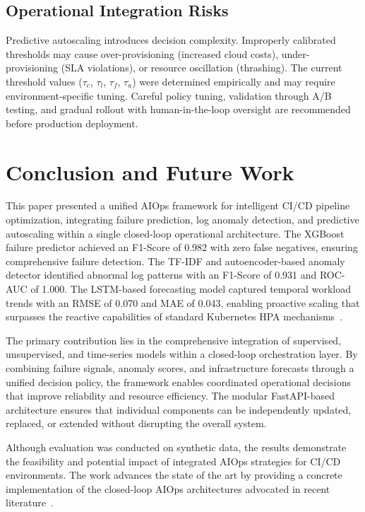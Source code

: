 \documentclass[sn-nature]{sn-jnl}
\theoremstyle{thmstyleone}
\theoremstyle{thmstyletwo}
\theoremstyle{thmstylethree}
\begin{document}
\subsection{Operational Integration Risks}\label{subsec:oprisk}

Predictive autoscaling introduces decision complexity. Improperly calibrated thresholds may cause over-provisioning (increased cloud costs), under-provisioning (SLA violations), or resource oscillation (thrashing). The current threshold values ($\tau_c$, $\tau_l$, $\tau_f$, $\tau_a$) were determined empirically and may require environment-specific tuning. Careful policy tuning, validation through A/B testing, and gradual rollout with human-in-the-loop oversight are recommended before production deployment.

\section{Conclusion and Future Work}\label{sec:conclusion}

This paper presented a unified AIOps framework for intelligent CI/CD pipeline optimization, integrating failure prediction, log anomaly detection, and predictive autoscaling within a single closed-loop operational architecture. The XGBoost failure predictor achieved an F1-Score of 0.982 with zero false negatives, ensuring comprehensive failure detection. The TF-IDF and autoencoder-based anomaly detector identified abnormal log patterns with an F1-Score of 0.931 and ROC-AUC of 1.000. The LSTM-based forecasting model captured temporal workload trends with an RMSE of 0.070 and MAE of 0.043, enabling proactive scaling that surpasses the reactive capabilities of standard Kubernetes HPA mechanisms~\cite{kubernetesDocs}.

The primary contribution lies in the comprehensive integration of supervised, unsupervised, and time-series models within a closed-loop orchestration layer. By combining failure signals, anomaly scores, and infrastructure forecasts through a unified decision policy, the framework enables coordinated operational decisions that improve reliability and resource efficiency. The modular FastAPI-based architecture ensures that individual components can be independently updated, replaced, or extended without disrupting the overall system.

Although evaluation was conducted on synthetic data, the results demonstrate the feasibility and potential impact of integrated AIOps strategies for CI/CD environments. The work advances the state of the art by providing a concrete implementation of the closed-loop AIOps architectures advocated in recent literature~\cite{dang2019aiops, notaro2021aiops, zota2025agentic}.
\end{document}
